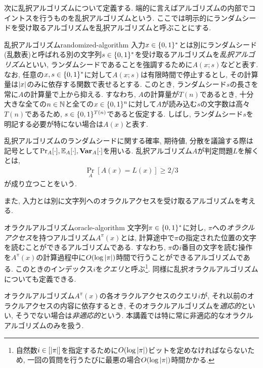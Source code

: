 次に乱択アルゴリズムについて定義する. 端的に言えばアルゴリズムの内部でコイントスを行うものを乱択アルゴリズムという.
ここでは明示的にランダムシードを受け取るアルゴリズムを乱択アルゴリズムと呼ぶことにする.

\begin{definition}{乱択アルゴリズム}{randomized-algorithm}
  入力$x\in\{0,1\}^*$とは別にランダムシード(乱数表)と呼ばれる別の文字列$s\in\{0,1\}^*$を受け取るアルゴリズムを\emph{乱択アルゴリズム}といい, ランダムシードであることを強調するために$A(x;s)$などと表す.
  なお, 任意の$x,s\in\{0,1\}^*$に対して$A(x;s)$は有限時間で停止するとし, その計算量は$\abs{x}$のみに依存する関数で表せるとする.
  このとき, ランダムシード$s$の長さを常に$A$の計算量で上から抑える.
  すなわち, $A$の計算量が$T(n)$であるとき, 十分大きな全ての$n\in\mathbb{N}$と全ての$x\in\{0,1\}^n$に対して$A$が読み込む$s$の文字数は高々$T(n)$であるため, $s\in \{0,1\}^{T(n)}$であると仮定する.
  しばし, ランダムシード$s$を明記する必要が特にない場合は$A(x)$と表す.

  乱択アルゴリズムのランダムシードに関する確率, 期待値, 分散を議論する際は記号として$\Pr_{A}[\cdot],\operatorname*{\mathbb{E}}_A[\cdot],\operatorname*{\mathbf{Var}}_A[\cdot]$を用いる.
  乱択アルゴリズム$A$が判定問題$L$を解くとは,
  \begin{align*}
    \Pr_A[A(x)=L(x)]\geq 2/3
  \end{align*}
  が成り立つことをいう.
\end{definition}

また, 入力とは別に文字列へのオラクルアクセスを受け取るアルゴリズムを考える.
\begin{definition}{オラクルアルゴリズム}{oracle-algorithm}
  文字列$\pi\in\{0,1\}^*$に対し, $\pi$への\emph{オラクルアクセス}を持つアルゴリズム$A^\pi(x)$とは, 計算途中で$\pi$の指定された位置の文字を読むことができるアルゴリズムである.
  すなわち, $\pi$の$i$番目の文字を読む操作を$A^\pi(x)$の計算過程中に$O(\log \abs{\pi})$時間で行うことができるアルゴリズムである. このときのインデックス$i$を\emph{クエリ}と呼ぶ\footnote{自然数$i\in[\abs{\pi}]$を指定するために$O(\log \abs{\pi})$ビットを定めなければならないため, 一回の質問を行うたびに最悪の場合$O(\log \abs{\pi})$時間かかる.}.
  同様に乱択オラクルアルゴリズムについても定義できる.

  オラクルアルゴリズム$A^\pi(x)$の各オラクルアクセスのクエリ$i$が, それ以前のオラクルアクセスの内容に依存するとき, そのオラクルアルゴリズムを\emph{適応的}といい, そうでない場合は\emph{非適応的}という.
  本講義では特に常に非適応的なオラクルアルゴリズムのみを扱う.
\end{definition}


